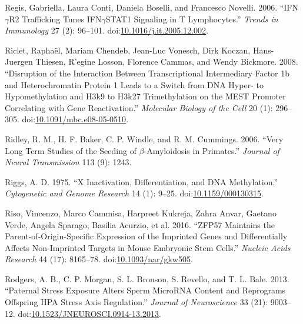 \documentclass[onehalf,12pt]{beavtex}
\begin{document}
  \hypertarget{ref-RegisIFNgR2traffickingtunes2006}{}
  Regis, Gabriella, Laura Conti, Daniela Boselli, and Francesco Novelli.
  2006. ``IFN\(\gamma\)R2 Trafficking Tunes IFN\(\gamma\)STAT1 Signaling
  in T Lymphocytes.'' \emph{Trends in Immunology} 27 (2): 96--101.
  doi:\href{https://doi.org/10.1016/j.it.2005.12.002}{10.1016/j.it.2005.12.002}.
  
  \hypertarget{ref-RicletDisruptionInteractionTranscriptional2008}{}
  Riclet, Raphaël, Mariam Chendeb, Jean-Luc Vonesch, Dirk Koczan,
  Hans-Juergen Thiesen, R\a'egine Losson, Florence Cammas, and Wendy
  Bickmore. 2008. ``Disruption of the Interaction Between Transcriptional
  Intermediary Factor 1b and Heterochromatin Protein 1 Leads to a Switch
  from DNA Hyper- to Hypomethylation and H3k9 to H3k27 Trimethylation on
  the MEST Promoter Correlating with Gene Reactivation.'' \emph{Molecular
  Biology of the Cell} 20 (1): 296--305.
  doi:\href{https://doi.org/10.1091/mbc.e08-05-0510}{10.1091/mbc.e08-05-0510}.
  
  \hypertarget{ref-RidleyVerylongterm2006}{}
  Ridley, R. M., H. F. Baker, C. P. Windle, and R. M. Cummings. 2006.
  ``Very Long Term Studies of the Seeding of \(\beta\)-Amyloidosis in
  Primates.'' \emph{Journal of Neural Transmission} 113 (9): 1243.
  
  \hypertarget{ref-RiggsinactivationdifferentiationDNA1975}{}
  Riggs, A. D. 1975. ``X Inactivation, Differentiation, and DNA
  Methylation.'' \emph{Cytogenetic and Genome Research} 14 (1): 9--25.
  doi:\href{https://doi.org/10.1159/000130315}{10.1159/000130315}.
  
  \hypertarget{ref-RisoZFP57maintainsparentoforiginspecific2016}{}
  Riso, Vincenzo, Marco Cammisa, Harpreet Kukreja, Zahra Anvar, Gaetano
  Verde, Angela Sparago, Basilia Acurzio, et al. 2016. ``ZFP57 Maintains
  the Parent-of-Origin-Specific Expression of the Imprinted Genes and
  Differentially Affects Non-Imprinted Targets in Mouse Embryonic Stem
  Cells.'' \emph{Nucleic Acids Research} 44 (17): 8165--78.
  doi:\href{https://doi.org/10.1093/nar/gkw505}{10.1093/nar/gkw505}.
  
  \hypertarget{ref-RodgersPaternalStressExposure2013}{}
  Rodgers, A. B., C. P. Morgan, S. L. Bronson, S. Revello, and T. L. Bale.
  2013. ``Paternal Stress Exposure Alters Sperm MicroRNA Content and
  Reprograms Offspring HPA Stress Axis Regulation.'' \emph{Journal of
  Neuroscience} 33 (21): 9003--12.
  doi:\href{https://doi.org/10.1523/JNEUROSCI.0914-13.2013}{10.1523/JNEUROSCI.0914-13.2013}.
  
\end{document}
